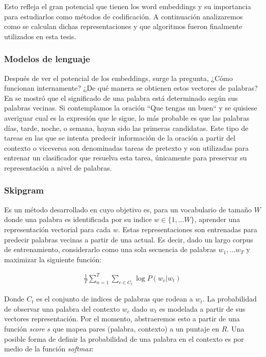 Esto refleja el gran potencial que tienen los word embeddings y su importancia
para estudiarlos como métodos de codificación. A continuación analizaremos como
se calculan dichas representaciones y que algoritmos fueron finalmente
utilizados en esta tesis.

\subsubsection{Modelos de lenguaje}

Después de ver el potencial de los embeddings, surge la pregunta, ¿Cómo
funcionan internamente? ¿De qué manera se obtienen estos vectores de palabras?
En \citep{firth-57} se mostró que el significado de una palabra está determinado
según sus palabras vecinas. Si contemplamos la oración ``Que tengas un buen`` y
se quisiese averiguar cual es la expresión que le sigue, lo más probable es que
las palabras días, tarde, noche, o semana, hayan sido las primeras candidatas.
Este tipo de tareas en las que se intenta predecir información de la oración a
partir del contexto o viceversa son denominadas tareas de pretexto y son
utilizadas para entrenar un clasificador que resuelva esta tarea, únicamente
para preservar su representación a nivel de palabras.

\subsubsection{Skipgram}

Es un método desarrollado en \citep{Mikolov-2013} cuyo objetivo es, para un
vocabulario de tamaño $W$ donde una palabra es identificada por su indice $w
\in \{1, ... W\}$, aprender una representación vectorial para cada $w$. Estas
representaciones son entrenadas para predecir palabras vecinas a partir de una
actual. Es decir, dado un largo corpus de entrenamiento, considerarlo como una
sola secuencia de palabras $w_1, ... w_T$ y maximizar la siguiente función:

\begin{align*}
    \frac{1}{T} \sum_{n=1}^{T} 
                    \sum_{c \in C_t} \log P(w_c | w_t)
\end{align*}

Donde $C_t$ es el conjunto de indices de palabras que rodean a $w_t$. La
probabilidad de observar una palabra del contexto $w_c$ dado $w_t$ es modelada a
partir de sus vectores representación. Por el momento, abstraeremos esto a
partir de una función \emph{score} $s$ que mapea pares (palabra, contexto) a un
puntaje en $R$. Una posible forma de definir la probabilidad de una palabra en
el contexto es por medio de la función \emph{softmax}:

